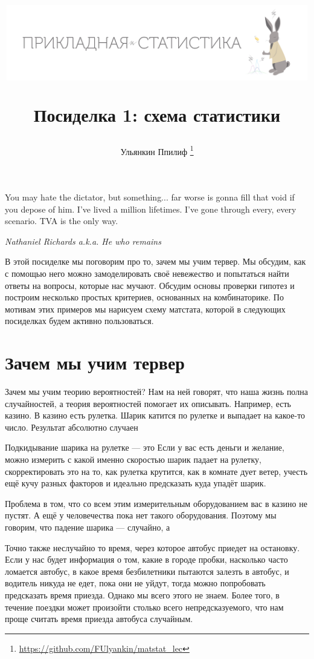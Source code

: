 \documentclass[12pt, a4paper, oneside]{article}
\title{
\begin{center} 
\includegraphics[width=0.99\textwidth]{logo.png}
\end{center}

Посиделка 1: схема статистики}
\date{ } %
\author{Ульянкин Ппилиф \thanks{\url{https://github.com/FUlyankin/matstat_lec}}}
\begin{document}

\maketitle

\epigraph{You may hate the dictator, but something... far worse is gonna fill that void if you depose of him. I've lived a million lifetimes. I've gone through every, every scenario. TVA is the only way.}{\textit{Nathaniel Richards a.k.a. He who remains}}


В этой посиделке мы поговорим про то, зачем мы учим тервер. Мы обсудим, как с помощью него можно замоделировать своё невежество и попытаться найти ответы на вопросы, которые нас мучают. Обсудим основы проверки гипотез и построим несколько простых критериев, основанных на комбинаторике. По мотивам этих примеров мы нарисуем схему матстата, которой в следующих посиделках будем активно пользоваться. 

\section{Зачем мы учим тервер}

Зачем мы учим теорию вероятностей? Нам на ней говорят, что наша жизнь полна случайностей, а теория вероятностей помогает их описывать. Например, есть казино. В казино есть рулетка. Шарик катится по рулетке и выпадает на какое-то число. Результат абсолютно случаен  

Подкидывание шарика на рулетке --- это  Если у вас есть деньги и желание, можно измерить с какой именно скоростью шарик падает на рулетку, скорректировать это на то, как рулетка крутится, как в комнате дует ветер, учесть ещё кучу разных факторов и идеально предсказать куда упадёт шарик. 

Проблема в том, что со всем этим измерительным оборудованием вас в казино не пустят. А ещё у человечества пока нет такого оборудования. Поэтому мы говорим, что падение шарика --- случайно, а 

Точно также неслучайно то время, через которое автобус приедет на остановку. Если у нас будет информация о том, какие в городе пробки, насколько часто ломается автобус, в какое время безбилетники пытаются залезть в автобус, и водитель никуда не едет, пока они не уйдут, тогда можно попробовать предсказать время приезда. Однако мы всего этого не знаем. Более того, в течение поездки может произойти столько всего непредсказуемого, что нам проще считать время приезда автобуса случайным. 
\end{document}
